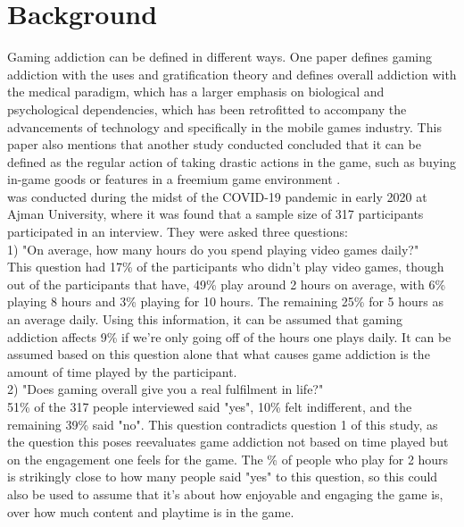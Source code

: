 \documentclass[conference]{IEEEtran}
\begin{document}
\section{Background}
Gaming addiction can be defined in different ways. One paper \cite{yasir2021} defines gaming addiction with the uses and gratification theory and defines overall addiction with the medical paradigm, which has a larger emphasis on biological and psychological dependencies, which has been retrofitted to accompany the advancements of technology and specifically in the mobile games industry. This paper also mentions that another study conducted concluded that it can be defined as the regular action of taking drastic actions in the game, such as buying in-game goods or features in a freemium game environment \cite{XWang2021}. \\

\cite{Naaj2021} was conducted during the midst of the COVID-19 pandemic in early 2020 at Ajman University, where it was found that a sample size of 317 participants participated in an interview. They were asked three questions: \\

1) "On average, how many hours do you spend playing video games daily?"\\
This question had 17\%  of the participants who didn't play video games, though out of the participants that have, 49\% play around 2 hours on average, with 6\%  playing 8 hours and 3\% playing for 10 hours. The remaining 25\%  for 5 hours as an average daily. Using this information, it can be assumed that gaming addiction affects 9\% if we're only going off of the hours one plays daily. It can be assumed based on this question alone that what causes game addiction is the amount of time played by the participant.\\

2) "Does gaming overall give you a real fulfilment in life?"\\
51\% of the 317 people interviewed said "yes", 10\% felt indifferent, and the remaining 39\% said "no".  This question contradicts question 1 of this study, as the question this poses reevaluates game addiction not based on time played but on the engagement one feels for the game. The \% of people who play for 2 hours is strikingly close to how many people said "yes" to this question, so this could also be used to assume that it's about how enjoyable and engaging the game is, over how much content and playtime is in the game.\\
\end{document}
